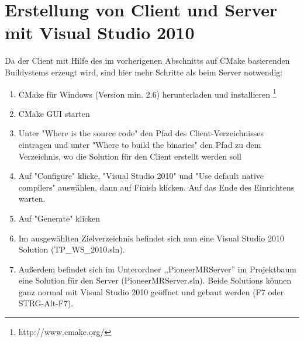 

\section{Erstellung von Client und Server mit Visual Studio  2010}
Da der Client mit Hilfe des im vorherigenen Abschnitts auf CMake
basierenden Buildystems erzeugt wird, sind hier mehr Schritte als beim
Server notwendig:
\begin{enumerate}
	\item CMake für Windows (Version min. 2.6) herunterladen und installieren
  \footnote{http://www.cmake.org/}
	\item CMake GUI starten
	\item Unter "Where is the source code" den Pfad des Client-Verzeichnisses
 eintragen und unter "Where to build the binaries" den Pfad zu dem
Verzeichnis, wo die Solution für den Client erstellt werden soll
	\item Auf "Configure" klicke, "Visual Studio 2010" und "Use default
native compilers" auswählen, dann auf Finish klicken. Auf das Ende des
Einrichtens warten.
	\item Auf "Generate" klicken
	\item Im ausgewählten Zielverzeichnis befindet sich nun eine
          Visual Studio 2010
Solution (TP\_WS\_2010.sln). 
\item Außerdem befindet sich im Unterordner ,,PioneerMRServer'' im
Projektbaum eine Solution für den
Server (PioneerMRServer.sln). Beide Solutions können ganz normal mit 
Visual Studio 2010 geöffnet und gebaut werden (F7 oder STRG-Alt-F7).
\end{enumerate}

